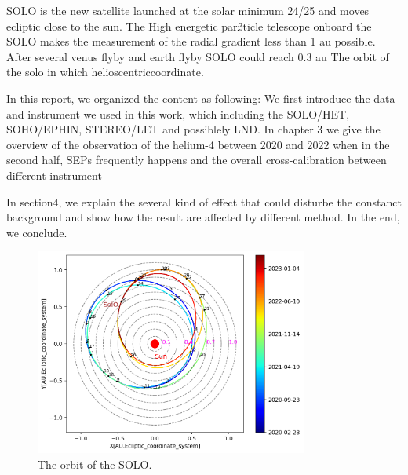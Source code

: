 SOLO is the new satellite launched at the solar minimum 24/25 and moves ecliptic close to the sun. 
The High energetic parßticle telescope onboard the SOLO makes the measurement of the radial gradient less than 1 au possible.
After several venus flyby and earth flyby SOLO could reach 0.3 au
The orbit of the solo in which helioscentriccoordinate.

In this report, we organized the content as following: We first introduce the data and instrument we used in this work, which including the SOLO/HET, SOHO/EPHIN, STEREO/LET and possiblely LND. In chapter 3 we give the overview of the observation of the helium-4 between 2020 and 2022 when in the second half, SEPs frequently happens and the overall cross-calibration between different instrument

In section4, we explain the several kind of effect that could disturbe the constanct background and show how the result are affected by different method.  In the end, we conclude.


\begin{figure}
    \centering
    \includegraphics[width=0.8\textwidth]{images/ACR/SOLO_orbit_helioscentric_carrington_orbitnumber.png}
    \caption{The orbit of the SOLO.}
    \label{fig:SOLO_orbit}
\end{figure}

